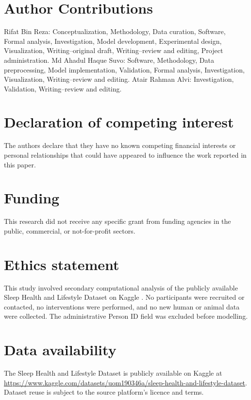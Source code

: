 \documentclass[a4paper,fleqn]{cas-dc}
\begin{document}
\fi


\section*{Author Contributions}

Rifat Bin Reza: Conceptualization, Methodology, Data curation, Software, Formal analysis, Investigation, Model development, Experimental design, Visualization, Writing--original draft, Writing--review and editing, Project administration. Md Ahadul Haque Suvo: Software, Methodology, Data preprocessing, Model implementation, Validation, Formal analysis, Investigation, Visualization, Writing--review and editing. Atair Rahman Alvi: Investigation, Validation, Writing--review and editing.



\section*{Declaration of competing interest}

The authors declare that they have no known competing financial interests or personal relationships that could have appeared to influence the work reported in this paper.

\section*{Funding}

This research did not receive any specific grant from funding agencies in the public, commercial, or not-for-profit sectors.

\section*{Ethics statement}

This study involved secondary computational analysis of the publicly available Sleep Health and Lifestyle Dataset on Kaggle \cite{kaggle2023}. No participants were recruited or contacted, no interventions were performed, and no new human or animal data were collected. The administrative Person ID field was excluded before modelling.

\section*{Data availability}

The Sleep Health and Lifestyle Dataset is publicly available on Kaggle at \url{https://www.kaggle.com/datasets/uom190346a/sleep-health-and-lifestyle-dataset}. Dataset reuse is subject to the source platform's licence and terms.
\end{document}
